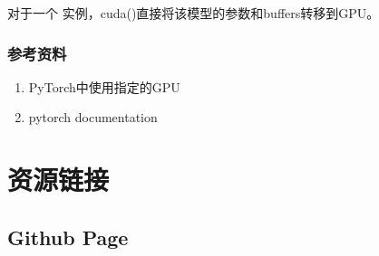 \documentclass[letterpaper,10pt,english]{sphinxmanual}
\begin{document}
%
\begin{sphinxVerbatim}[commandchars=\\\{\}]
  
\end{sphinxVerbatim}

对于一个  实例，cuda()直接将该模型的参数和buffers转移到GPU。

%
\begin{sphinxVerbatim}[commandchars=\\\{\}]
\end{sphinxVerbatim}


\subsection{参考资料}
\label{\detokenize{deepLearning/06_cuda:id1}}\begin{enumerate}
\item {} 
PyTorch中使用指定的GPU

\end{enumerate}
\begin{quote}

\end{quote}
\begin{enumerate}
\setcounter{enumi}{1}
\item {} 
pytorch documentation

\end{enumerate}
\begin{quote}


\end{quote}


\chapter{资源链接}
\label{\detokenize{link/index::doc}}\label{\detokenize{link/index:id1}}

\section{Github Page}
\label{\detokenize{link/index:github-page}}
\end{document}
